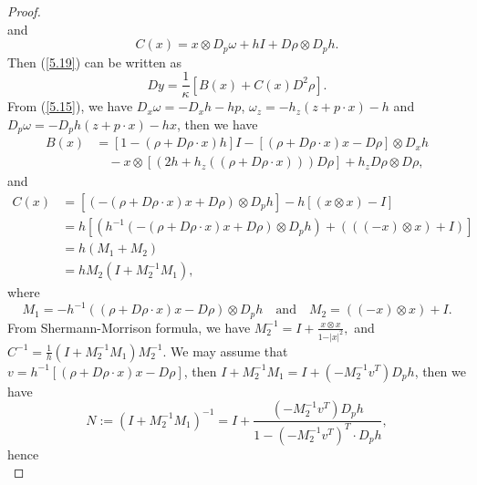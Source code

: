\documentclass[10pt,a4paper]{amsart}
\begin{document}
\begin{proof}
\begin{equation}
  \end{equation}
  and
  \begin{equation}\label{5.21}
    C(x) = x \otimes D_{p}\omega + hI + D\rho \otimes D_{p}h.
  \end{equation}
  Then (\ref{5.19}) can be written as
  \begin{equation}\label{5.22}
    Dy = \frac{1}{\kappa}[B(x) + C(x)D^{2}\rho].
  \end{equation}
  From (\ref{5.15}), we have $D_{x}\omega = -D_{x}h -hp$, $\omega_{z} = -h_{z}(z + p \cdot x) - h$ and $D_{p}\omega = -D_{p}h(z + p \cdot x) - hx$, then we have
  \begin{equation}\label{5.23}
    \begin{aligned}
    B(x) & = [1 - (\rho + D\rho \cdot x)h]I - [(\rho + D\rho \cdot x)x - D\rho]\otimes D_{x}h  \\
    & \quad - x\otimes [(2h + h_{z}((\rho + D\rho \cdot x)))D\rho] + h_{z}D\rho \otimes D\rho,
    \end{aligned}
  \end{equation}
  and
  \begin{equation}\label{5.24}
    \begin{aligned}
    C(x) & = [(-(\rho + D\rho \cdot x)x + D\rho) \otimes D_{p}h] - h[(x \otimes x) - I] \\
    & = h[(h^{-1}(-(\rho + D\rho \cdot x)x + D\rho)\otimes D_{p}h) + (((-x) \otimes x) + I)] \\
    & = h(M_{1} + M_{2}) \\
    & = h M_{2}(I + M_{2}^{-1}M_{1}),
    \end{aligned}
  \end{equation}
  where
  \begin{equation*}
    M_{1} = -h^{-1}((\rho + D\rho \cdot x)x - D\rho) \otimes D_{p}h \quad \text{and} \quad M_{2} = ((-x)\otimes x) + I.
  \end{equation*}
  From Shermann-Morrison formula, we have
 $
    M_{2}^{-1} = I + \frac{x \otimes x}{1 - \vert x \vert^{2}},
 $
  and
 $
    C^{-1} = \frac{1}{h}(I + M_{2}^{-1}M_{1})M_{2}^{-1}.
  $
  We may assume that $v = h^{-1}[(\rho + D\rho \cdot x)x - D\rho]$, then $I + M_{2}^{-1}M_{1} = I + (-M_{2}^{-1}v^{T})D_{p}h$, then we have
  \begin{equation*}
    N := (I + M_{2}^{-1}M_{1})^{-1} = I + \frac{(-M_{2}^{-1}v^{T})D_{p}h}{1 - (-M_{2}^{-1}v^{T})^{T}\cdot D_{p}h},
  \end{equation*}
  hence
  \begin{equation}\label{5.25}

\end{equation}
\end{proof}
\end{document}
